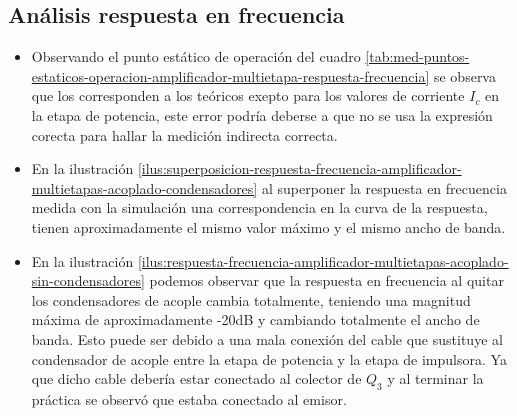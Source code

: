 \subsection{Análisis respuesta en frecuencia}


\begin{itemize}
    \item Observando el punto estático de operación del cuadro \ref{tab:med-puntos-estaticos-operacion-amplificador-multietapa-respuesta-frecuencia} se observa que los corresponden a los teóricos exepto para los valores de corriente $I_c$ en la etapa de potencia, este error podría deberse a que no se usa la expresión corecta para hallar la medición indirecta correcta.
    \item En la ilustración \ref{ilus:superposicion-respuesta-frecuencia-amplificador-multietapas-acoplado-condensadores} al superponer la respuesta en frecuencia medida con la simulación una correspondencia en la curva de la respuesta, tienen aproximadamente el mismo valor máximo y el mismo ancho de banda.
    \item En la ilustración \ref{ilus:respuesta-frecuencia-amplificador-multietapas-acoplado-sin-condensadores} podemos observar que la respuesta en frecuencia al quitar los condensadores de acople cambia totalmente, teniendo una magnitud máxima de aproximadamente -20dB y cambiando totalmente el ancho de banda. Esto puede ser debido a una mala conexión del cable que sustituye al condensador de acople entre la etapa de potencia y la etapa de impulsora. Ya que dicho cable debería estar conectado al colector de $Q_3$ y al terminar la práctica se observó que estaba conectado al emisor.

\end{itemize}
